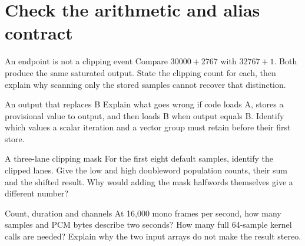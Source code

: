 \section{Check the arithmetic and alias contract}\label{pcm-questions}
\begin{MARSExercise}{An endpoint is not a clipping event}
  Compare $30000+2767$ with $32767+1$. Both produce the same saturated output.
  State the clipping count for each, then explain why scanning only the stored
  samples cannot recover that distinction.
\end{MARSExercise}
\begin{MARSExercise}{An output that replaces B}
  Explain what goes wrong if code loads A, stores a provisional value to output,
  and then loads B when output equals B. Identify which values a scalar iteration
  and a vector group must retain before their first store.
\end{MARSExercise}
\begin{MARSExercise}{A three-lane clipping mask}
  For the first eight default samples, identify the clipped lanes. Give the low and
  high doubleword population counts, their sum and the shifted result. Why would
  adding the mask halfwords themselves give a different number?
\end{MARSExercise}
\begin{MARSExercise}{Count, duration and channels}
  At 16,000 mono frames per second, how many samples and PCM bytes describe two
  seconds? How many full 64-sample kernel calls are needed? Explain why the two
  input arrays do not make the result stereo.
\end{MARSExercise}
